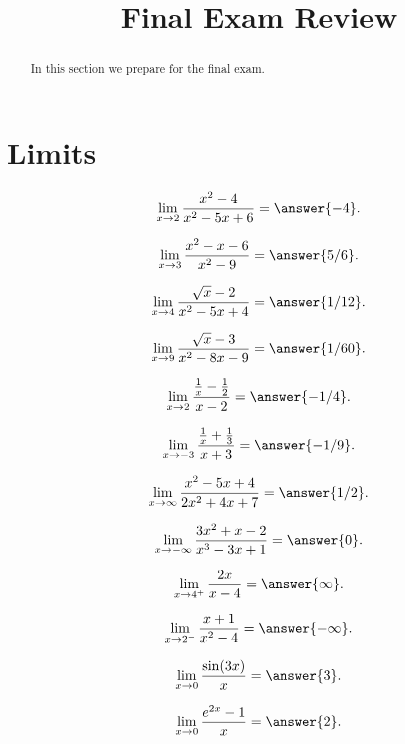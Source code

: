 \documentclass{ximera}
\title{Final Exam Review}
\begin{document}
\begin{abstract}
In this section we prepare for the final exam.
\end{abstract}

\maketitle



\section{Limits}


\begin{problem}
\[\lim_{x \to 2} \frac{x^2 - 4}{x^2 - 5x + 6} = \answer{-4}.\]

\[\lim_{x \to 3} \frac{x^2 -x -6}{x^2 - 9} = \answer{5/6}.\]
\end{problem}


\begin{problem}
\[\lim_{x \to 4} \frac{\sqrt x - 2}{x^2 - 5x + 4} = \answer{1/12}.\]

\[\lim_{x \to 9} \frac{\sqrt x - 3}{x^2 - 8x - 9} = \answer{1/60}.\]
\end{problem}

\begin{problem}
\[\lim_{x \to 2} \frac{\frac{1}{x} - \frac12 }{x- 2} = \answer{-1/4}.\]

\[\lim_{x \to {-3}} \frac{\frac{1}{x} + \frac13 }{x+ 3} = \answer{-1/9}.\]
\end{problem}

\begin{problem}
\[\lim_{x \to \infty} \frac{x^2 - 5x + 4}{2x^2 + 4x + 7} = \answer{1/2}.\]

\[\lim_{x \to -\infty} \frac{3x^2 + x - 2}{x^3 -3x + 1} = \answer{0}.\]
\end{problem}

\begin{problem}
\[\lim_{x \to 4^+} \frac{2x}{x-4} = \answer{\infty}.\]

\[\lim_{x \to 2^-} \frac{x+1}{x^2 - 4} = \answer{-\infty}.\]
\end{problem}



\begin{problem}
\[\lim_{x \to 0} \frac{\sin(3x)}{x} = \answer{3}.\]

\[\lim_{x \to 0} \frac{e^{2x} -1}{x} = \answer{2}.\]
\end{problem}
\end{document}
